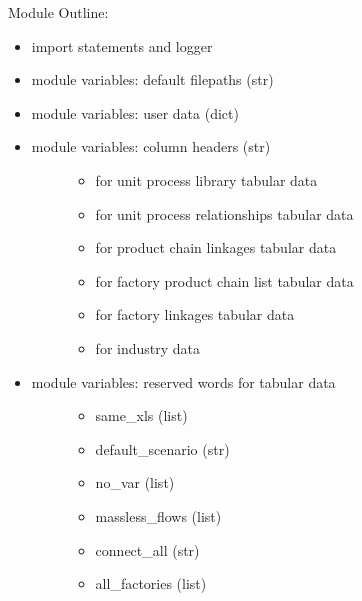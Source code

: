 \documentclass[a4paper,10pt,english]{sphinxmanual}
\begin{document}
Module Outline:
\begin{itemize}
\item {} 
import statements and logger

\item {} 
module variables: default filepaths (str)

\item {} 
module variables: user data (dict)

\item {} \begin{description}
\item[{module variables: column headers (str)}] \leavevmode\begin{itemize}
\item {} 
for unit process library tabular data

\item {} 
for unit process relationships tabular data

\item {} 
for product chain linkages tabular data

\item {} 
for factory product chain list tabular data

\item {} 
for factory linkages tabular data

\item {} 
for industry data

\end{itemize}

\end{description}

\item {} \begin{description}
\item[{module variables: reserved words for tabular data}] \leavevmode\begin{itemize}
\item {} 
same\_xls (list)

\item {} 
default\_scenario (str)

\item {} 
no\_var (list)

\item {} 
massless\_flows (list)

\item {} 
connect\_all (str)

\item {} 
all\_factories (list)

\end{itemize}

\end{description}

\end{itemize}
\end{document}
